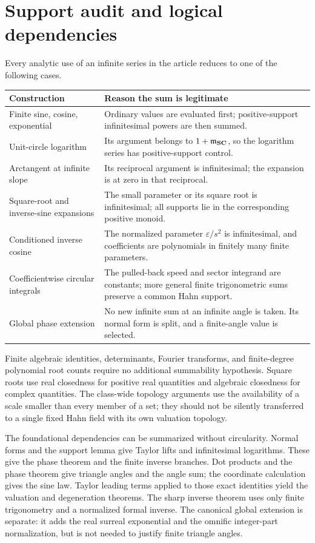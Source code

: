 \documentclass[11pt,letterpaper]{article}
\theoremstyle{definition}
\theoremstyle{remark}
\newcommand{\SC}{\mathbf{SC}}
\numberwithin{equation}{section}
\begin{document}
\section{Support audit and logical dependencies}\label{app:support}
Every analytic use of an infinite series in the article reduces to one of the following cases.
\begin{center}\small
\begin{tabular}{@{}L{0.36\textwidth}L{0.57\textwidth}@{}}
\toprule
Construction & Reason the sum is legitimate\\
\midrule
Finite sine, cosine, exponential & Ordinary values are evaluated first; positive-support infinitesimal powers are then summed.\\[0.5em]
Unit-circle logarithm & Its argument belongs to $1+\mm_{\SC}$, so the logarithm series has positive-support control.\\[0.5em]
Arctangent at infinite slope & Its reciprocal argument is infinitesimal; the expansion is at zero in that reciprocal.\\[0.5em]
Square-root and inverse-sine expansions & The small parameter or its square root is infinitesimal; all supports lie in the corresponding positive monoid.\\[0.5em]
Conditioned inverse cosine & The normalized parameter $\varepsilon/s^2$ is infinitesimal, and coefficients are polynomials in finitely many finite parameters.\\[0.5em]
Coefficientwise circular integrals & The pulled-back speed and sector integrand are constants; more general finite trigonometric sums preserve a common Hahn support.\\[0.5em]
Global phase extension & No new infinite sum at an infinite angle is taken. Its normal form is split, and a finite-angle value is selected.\\
\bottomrule
\end{tabular}
\end{center}
Finite algebraic identities, determinants, Fourier transforms, and finite-degree polynomial root counts require no additional summability hypothesis. Square roots use real closedness for positive real quantities and algebraic closedness for complex quantities. The class-wide topology arguments use the availability of a scale smaller than every member of a set; they should not be silently transferred to a single fixed Hahn field with its own valuation topology.

The foundational dependencies can be summarized without circularity. Normal forms and the support lemma give Taylor lifts and infinitesimal logarithms. These give the phase theorem and the finite inverse branches. Dot products and the phase theorem give triangle angles and the angle sum; the coordinate calculation gives the sine law. Taylor leading terms applied to those exact identities yield the valuation and degeneration theorems. The sharp inverse theorem uses only finite trigonometry and a normalized formal inverse. The canonical global extension is separate: it adds the real surreal exponential and the omnific integer-part normalization, but is not needed to justify finite triangle angles.
\end{document}
